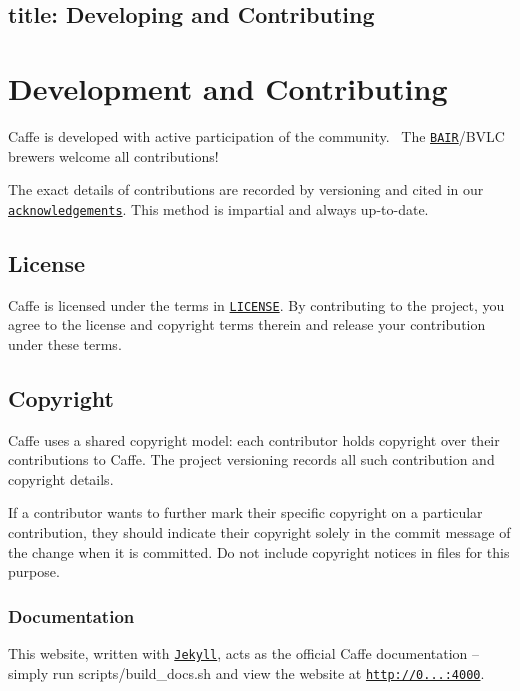 

 \subsection*{title\+: Developing and Contributing }

\section*{Development and Contributing}

Caffe is developed with active participation of the community.~\newline
 The \href{http://bair.berkeley.edu/}{\tt B\+A\+IR}/\+B\+V\+LC brewers welcome all contributions!

The exact details of contributions are recorded by versioning and cited in our \href{http://caffe.berkeleyvision.org/#acknowledgements}{\tt acknowledgements}. This method is impartial and always up-\/to-\/date.

\subsection*{License}

Caffe is licensed under the terms in \href{https://github.com/BVLC/caffe/blob/master/LICENSE}{\tt L\+I\+C\+E\+N\+SE}. By contributing to the project, you agree to the license and copyright terms therein and release your contribution under these terms.

\subsection*{Copyright}

Caffe uses a shared copyright model\+: each contributor holds copyright over their contributions to Caffe. The project versioning records all such contribution and copyright details.

If a contributor wants to further mark their specific copyright on a particular contribution, they should indicate their copyright solely in the commit message of the change when it is committed. Do not include copyright notices in files for this purpose.

\subsubsection*{Documentation}

This website, written with \href{http://jekyllrb.com/}{\tt Jekyll}, acts as the official Caffe documentation -- simply run {\ttfamily scripts/build\+\_\+docs.\+sh} and view the website at {\ttfamily \href{http://0.0.0.0:4000}{\tt http\+://0...\+:4000}}.

